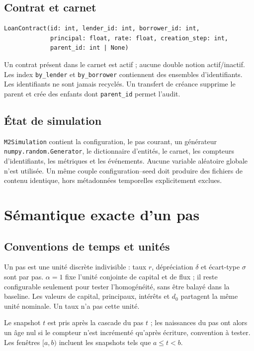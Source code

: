 \documentclass[11pt,a4paper]{article}
\newcommand{\code}[1]{\texttt{#1}}
\begin{document}
\subsection{Contrat et carnet}

\begin{verbatim}
LoanContract(id: int, lender_id: int, borrower_id: int,
             principal: float, rate: float, creation_step: int,
             parent_id: int | None)
\end{verbatim}
Un contrat présent dans le carnet est actif ; aucune double notion
actif/inactif. Les index \code{by\_lender} et \code{by\_borrower} contiennent des
ensembles d'identifiants. Les identifiants ne sont jamais recyclés. Un transfert
de créance supprime le parent et crée des enfants dont \code{parent\_id} permet
l'audit.

\subsection{État de simulation}

\code{M2Simulation} contient la configuration, le pas courant, un générateur
\code{numpy.random.Generator}, le dictionnaire d'entités, le carnet, les compteurs
d'identifiants, les métriques et les événements. Aucune variable aléatoire
globale n'est utilisée. Un même couple configuration--seed doit produire des
fichiers de contenu identique, hors métadonnées temporelles explicitement
exclues.

\section{Sémantique exacte d'un pas}

\subsection{Conventions de temps et unités}

Un pas est une unité discrète indivisible : taux $r$, dépréciation $\delta$ et
écart-type $\sigma$ sont par pas. $\alpha=1$ fixe l'unité conjointe de capital et
de flux ; il reste configurable seulement pour tester l'homogénéité, sans être
balayé dans la baseline. Les valeurs de capital, principaux, intérêts et $d_0$
partagent la même unité nominale. Un taux n'a pas cette unité.

Le snapshot $t$ est pris après la cascade du pas $t$ ; les naissances du pas ont
alors un âge nul si le compteur n'est incrémenté qu'après écriture, convention à
tester. Les fenêtres $[a,b)$ incluent les snapshots tels que $a\leq t<b$.
\end{document}
